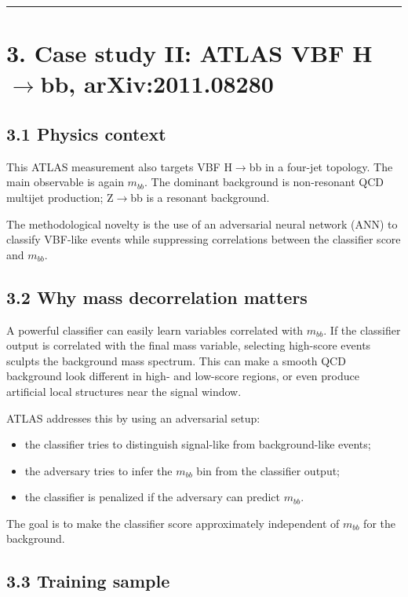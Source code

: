 \documentclass[11pt]{article}
\begin{document}
\bigskip\hrule\bigskip

\section{3. Case study II: ATLAS VBF H$\to$bb, arXiv:2011.08280}

\subsection{3.1 Physics context}

This ATLAS measurement also targets VBF H$\to$bb in a four-jet topology. The main observable is again \(m_{bb}\). The dominant background is non-resonant QCD multijet production; Z$\to$bb is a resonant background.

The methodological novelty is the use of an adversarial neural network (ANN) to classify VBF-like events while suppressing correlations between the classifier score and \(m_{bb}\).

\subsection{3.2 Why mass decorrelation matters}

A powerful classifier can easily learn variables correlated with \(m_{bb}\). If the classifier output is correlated with the final mass variable, selecting high-score events sculpts the background mass spectrum. This can make a smooth QCD background look different in high- and low-score regions, or even produce artificial local structures near the signal window.

ATLAS addresses this by using an adversarial setup:

\begin{itemize}
\item the classifier tries to distinguish signal-like from background-like events;
\item the adversary tries to infer the \(m_{bb}\) bin from the classifier output;
\item the classifier is penalized if the adversary can predict \(m_{bb}\).
\end{itemize}

The goal is to make the classifier score approximately independent of \(m_{bb}\) for the background.

\subsection{3.3 Training sample}
\end{document}
